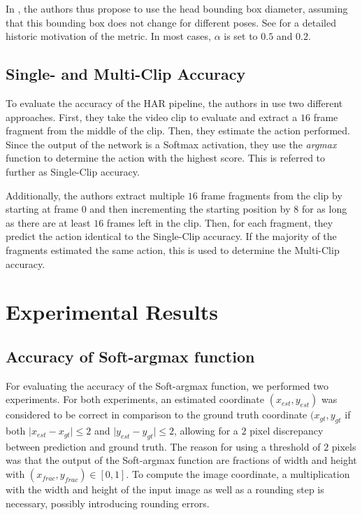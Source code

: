 In \cite{andriluka_2d_2014}, the authors thus propose to use the head bounding box diameter, assuming that this bounding box does not change for different poses.
See  for a detailed historic motivation of the metric.
In most cases, $\alpha$ is set to $0.5$ and $0.2$.

\subsection{Single- and Multi-Clip Accuracy}
To evaluate the accuracy of the HAR pipeline, the authors in \cite{luvizon_2d/3d_2018} use two different approaches.
First, they take the video clip to evaluate and extract a $16$ frame fragment from the middle of the clip.
Then, they estimate the action performed.
Since the output of the network is a Softmax activation, they use the \textit{argmax} function to determine the action with the highest score.
This is referred to further as Single-Clip accuracy.

Additionally, the authors extract multiple $16$ frame fragments from the clip by starting at frame $0$ and then incrementing the starting position by $8$ for as long as there are at least $16$ frames left in the clip.
Then, for each fragment, they predict the action identical to the Single-Clip accuracy.
If the majority of the fragments estimated the same action, this is used to determine the Multi-Clip accuracy. 

\section{Experimental Results}
\subsection{Accuracy of Soft-argmax function}
For evaluating the accuracy of the Soft-argmax function, we performed two experiments.
For both experiments, an estimated coordinate $(x_{est},y_{est})$ was considered to be correct in comparison to the ground truth coordinate $(x_{gt}, y_{gt}$ if both $\lvert x_{est} - x_{gt} \rvert \leq 2$ and $\lvert y_{est} - y_{gt} \rvert \leq 2$, allowing for a $2$ pixel discrepancy between prediction and ground truth.
The reason for using a threshold of $2$ pixels was that the output of the Soft-argmax function are fractions of width and height with $(x_{frac}, y_{frac}) \in [0,1]$.
To compute the image coordinate, a multiplication with the width and height of the input image as well as a rounding step is necessary, possibly introducing rounding errors.

